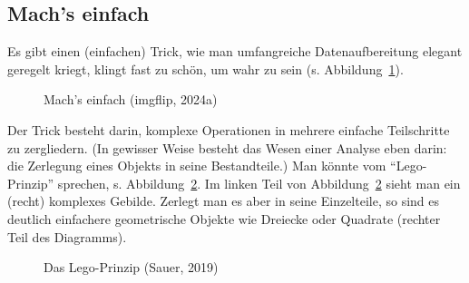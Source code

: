 \documentclass[
  letterpaper,
]{scrbook}
\theoremstyle{definition}
\theoremstyle{definition}
\theoremstyle{definition}
\theoremstyle{remark}
\begin{document}
\subsection{Mach's einfach}\label{machs-einfach}

Es gibt einen (einfachen) Trick, wie man umfangreiche Datenaufbereitung
elegant geregelt kriegt, klingt fast zu schön, um wahr zu sein (s.
Abbildung~\ref{fig-that-would-be-great}).

\begin{figure}


\caption{\label{fig-that-would-be-great}Mach's einfach (imgflip, 2024a)}

\end{figure}%

Der Trick besteht darin, komplexe Operationen in mehrere einfache
Teilschritte zu zergliedern. (In gewisser Weise besteht das Wesen einer
Analyse eben darin: die Zerlegung eines Objekts in seine Bestandteile.)
Man könnte vom ``Lego-Prinzip'' sprechen, s. Abbildung~\ref{fig-lego}.
Im linken Teil von Abbildung~\ref{fig-lego} sieht man ein (recht)
komplexes Gebilde. Zerlegt man es aber in seine Einzelteile, so sind es
deutlich einfachere geometrische Objekte wie Dreiecke oder Quadrate
(rechter Teil des Diagramms).

\begin{figure}


\caption{\label{fig-lego}Das Lego-Prinzip (Sauer, 2019)}

\end{figure}%
\end{document}
